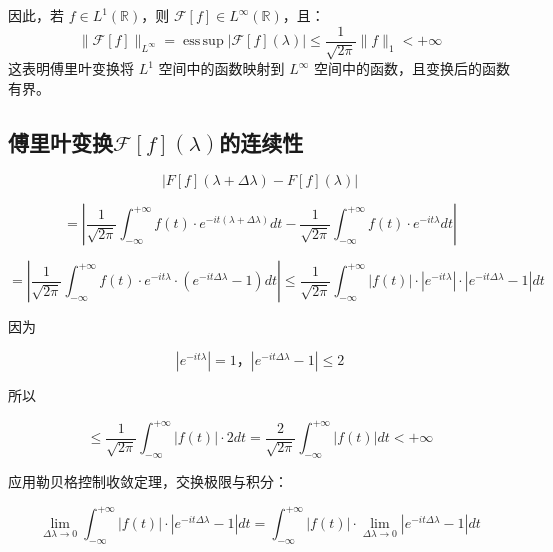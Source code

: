 \documentclass[12pt,a4paper]{article}
\theoremstyle{plain}
\theoremstyle{definition}
\theoremstyle{remark}
\begin{document}
	因此，若 $f \in L^1(\mathbb{R})$，则 $\mathcal{F}[f] \in L^\infty(\mathbb{R})$，且：
	\[
	\|\mathcal{F}[f]\|_{L^\infty} = \operatorname{ess\,sup} |\mathcal{F}[f](\lambda)| \leq \frac{1}{\sqrt{2\pi}} \|f\|_1 < +\infty
	\]
	这表明傅里叶变换将 $L^1$ 空间中的函数映射到 $L^\infty$ 空间中的函数，且变换后的函数有界。
	
\subsection{傅里叶变换\(\mathcal{F}[f](\lambda)\)的连续性}


\[ |F[f](\lambda + \Delta \lambda) - F[f](\lambda)| \]

\[ = \left| \frac{1}{\sqrt{2\pi}} \int_{-\infty}^{+\infty} f(t) \cdot e^{-it(\lambda + \Delta \lambda)} dt - \frac{1}{\sqrt{2\pi}} \int_{-\infty}^{+\infty} f(t) \cdot e^{-it\lambda} dt \right| \]

\[ = \left| \frac{1}{\sqrt{2\pi}} \int_{-\infty}^{+\infty} f(t) \cdot e^{-it\lambda} \cdot (e^{-it\Delta \lambda} - 1) dt \right| \leq \frac{1}{\sqrt{2\pi}} \int_{-\infty}^{+\infty} |f(t)| \cdot |e^{-it\lambda}| \cdot |e^{-it\Delta \lambda} - 1| dt \]

因为

\[ |e^{-it\lambda}| = 1，	|e^{-it\Delta \lambda} - 1| \leq 2 \]

所以

\[ \leq \frac{1}{\sqrt{2\pi}} \int_{-\infty}^{+\infty} |f(t)| \cdot 2 dt = \frac{2}{\sqrt{2\pi}} \int_{-\infty}^{+\infty} |f(t)| dt < +\infty \]

应用勒贝格控制收敛定理，交换极限与积分：

\[ \lim_{\Delta \lambda \to 0} \int_{-\infty}^{+\infty} |f(t)| \cdot |e^{-it\Delta \lambda} - 1| dt = \int_{-\infty}^{+\infty} |f(t)| \cdot \lim_{\Delta \lambda \to 0} |e^{-it\Delta \lambda} - 1| dt \]
\end{document}
